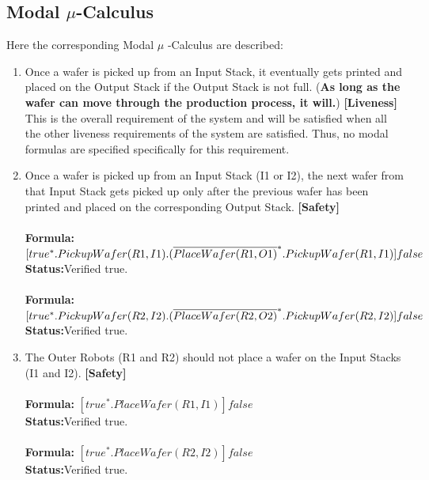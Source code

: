 \documentclass[a4paper,12pt]{article}
\begin{document}
	\subsection{Modal $\mu$-Calculus}
	Here the corresponding Modal $\mu$ -Calculus are described:
	\begin{enumerate}
		\item Once a wafer is picked up from an Input Stack, it eventually gets printed and placed on the Output Stack if the Output Stack is not full. (\textbf{As long as the wafer can move through the production process, it will.}) \textbf{[Liveness]}
		\\
		This is the overall requirement of the system and will be satisfied when all the other liveness requirements of the system are satisfied. Thus, no modal formulas are specified specifically for this requirement.
		
		\item Once a wafer is picked up from an Input Stack (I1 or I2), the next wafer from that Input Stack gets picked up only after the previous wafer has been printed and placed on the corresponding Output Stack. \textbf{[Safety]}
		\\
		\\\textbf{Formula:} $[true^*.PickupWafer(R1, I1) \\.(\overline{PlaceWafer(R1,O1)}^*.PickupWafer(R1,I1)]false$ \\\textbf{Status:}Verified true.
		\\
		\\\textbf{Formula:} $[true^*.PickupWafer(R2, I2)
		\\.(\overline{PlaceWafer(R2,O2)}^*.PickupWafer(R2,I2)]false$ \\\textbf{Status:}Verified true.
		
		\item The Outer Robots (R1 and R2) should not place a wafer on the Input Stacks (I1 and I2). \textbf{[Safety]}
		\\
		\\\textbf{Formula:} $[true^*. PlaceWafer(R1,I1)]false $ \\\textbf{Status:}Verified true.
		\\
		\\\textbf{Formula:} $[true^*. PlaceWafer(R2,I2)]false $ \\\textbf{Status:}Verified true.
		

\end{enumerate}
\end{document}
